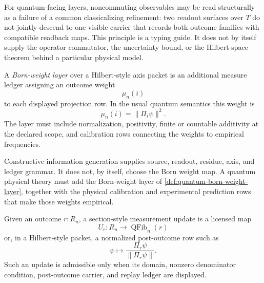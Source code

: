 \begin{principle}
\label{prin:quantum-noncommutativity-common-refinement-boundary}
For quantum-facing layers, noncommuting observables may be read
structurally as a failure of a common classicalizing refinement: two
readout surfaces over $T$ do not jointly descend to one visible carrier
that records both outcome families with compatible readback maps. This
principle is a typing guide. It does not by itself supply the operator
commutator, the uncertainty bound, or the Hilbert-space theorem behind a
particular physical model.
\end{principle}

\begin{definition}
\label{def:quantum-born-weight-layer}
A \emph{Born-weight layer} over a Hilbert-style axis packet is an
additional measure ledger assigning an outcome weight
$$
\mu_n(i)
$$
to each displayed projection row. In the usual quantum semantics this
weight is
$$
\mu_n(i)=\|\Pi_i\psi\|^2.
$$
The layer must include normalization, positivity, finite or countable
additivity at the declared scope, and calibration rows connecting the
weights to empirical frequencies.
\end{definition}

\begin{principle}
\label{prin:quantum-born-rule-not-supplied-by-projection-grammar}
Constructive information generation supplies source, readout, residue,
axis, and ledger grammar. It does not, by itself, choose the Born weight
map. A quantum physical theory must add the Born-weight layer of
\autoref{def:quantum-born-weight-layer}, together with the physical
calibration and experimental prediction rows that make those weights
empirical.
\end{principle}

\begin{definition}
\label{def:quantum-section-style-measurement-update}
Given an outcome $r:R_n$, a section-style measurement update is a
licensed map
$$
U_r:R_n\to\operatorname{QFib}_n(r)
$$
or, in a Hilbert-style packet, a normalized post-outcome row such as
$$
\psi\mapsto\frac{\Pi_r\psi}{\|\Pi_r\psi\|}.
$$
Such an update is admissible only when its domain, nonzero denominator
condition, post-outcome carrier, and replay ledger are displayed.
\end{definition}

